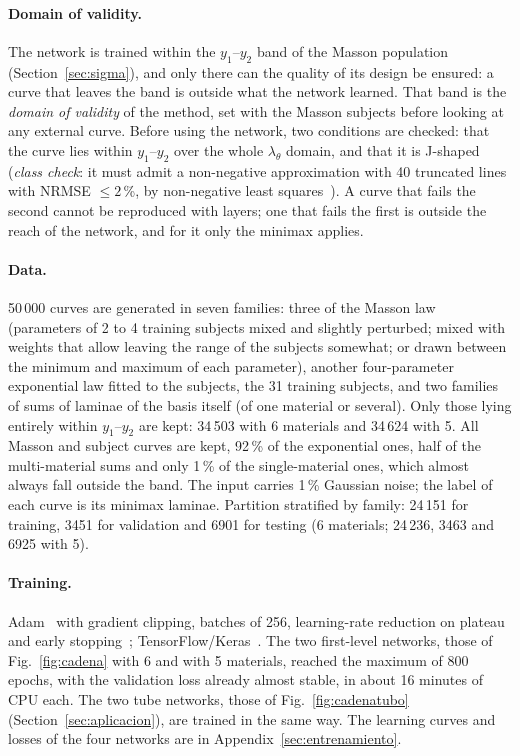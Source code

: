 \paragraph{Domain of validity.} The network is trained within the $y_1$--$y_2$ band of the Masson population (Section~\ref{sec:sigma}), and only there can the quality of its design be ensured: a curve that leaves the band is outside what the network learned. That band is the \emph{domain of validity} of the method, set with the Masson subjects before looking at any external curve. Before using the network, two conditions are checked: that the curve lies within $y_1$--$y_2$ over the whole $\lambda_\theta$ domain, and that it is J-shaped (\emph{class check}: it must admit a non-negative approximation with 40 truncated lines with NRMSE $\le2$\,\%, by non-negative least squares~\cite{lawson}). A curve that fails the second cannot be reproduced with layers; one that fails the first is outside the reach of the network, and for it only the minimax applies.

\paragraph{Data.} 50\,000 curves are generated in seven families: three of the Masson law (parameters of 2 to 4 training subjects mixed and slightly perturbed; mixed with weights that allow leaving the range of the subjects somewhat; or drawn between the minimum and maximum of each parameter), another four-parameter exponential law fitted to the subjects, the 31 training subjects, and two families of sums of laminae of the basis itself (of one material or several). Only those lying entirely within $y_1$--$y_2$ are kept: 34\,503 with 6 materials and 34\,624 with 5. All Masson and subject curves are kept, 92\,\% of the exponential ones, half of the multi-material sums and only 1\,\% of the single-material ones, which almost always fall outside the band. The input carries 1\,\% Gaussian noise; the label of each curve is its minimax laminae. Partition stratified by family: 24\,151 for training, 3451 for validation and 6901 for testing (6 materials; 24\,236, 3463 and 6925 with 5).

\paragraph{Training.} Adam~\cite{adam} with gradient clipping, batches of 256, learning-rate reduction on plateau and early stopping~\cite{prechelt}; TensorFlow/Keras~\cite{tf}. The two first-level networks, those of Fig.~\ref{fig:cadena} with 6 and with 5 materials, reached the maximum of 800 epochs, with the validation loss already almost stable, in about 16 minutes of CPU each. The two tube networks, those of Fig.~\ref{fig:cadenatubo} (Section~\ref{sec:aplicacion}), are trained in the same way. The learning curves and losses of the four networks are in Appendix~\ref{sec:entrenamiento}.

